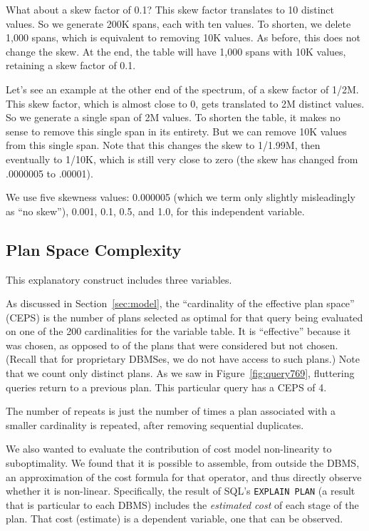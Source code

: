 \documentclass[prodmode,acmtods]{acmsmall}
\begin{document}
What about a skew factor of 0.1? 
This skew factor translates to 10 distinct values. 
So we generate 200K spans, each with ten values. 
To shorten, we delete 1,000 spans, which is equivalent to removing 10K values. 
As before, this does not change the skew.
At the end, the table will have 1,000 spans with 10K values, retaining a
skew factor of 0.1.

Let's see an example at the other end of the spectrum, of a skew factor of
1/2M.  This skew factor, which is almost close to 0, gets translated to 2M
distinct values.  So we generate a single span of 2M values.  To shorten the
table, it makes no sense to remove this single span in its entirety. But we
can remove 10K values from this single span.  Note that this changes the
skew to 1/1.99M, then eventually to 1/10K, which is still very close to zero
(the skew has changed from .0000005 to .00001).

We use five skewness values: 0.000005 (which we term only slightly
misleadingly as ``no skew''), 0.001, 0.1, 0.5, and 1.0,
for this independent variable.

\subsection{Plan Space Complexity}\label{sec:discontinuity}

This explanatory construct includes three variables.

As discussed in Section~\ref{sec:model}, the ``cardinality of the effective plan
space'' (CEPS) is the number of plans selected as optimal for that query
being evaluated on one of the 200 cardinalities for the variable table. It
is ``effective'' because it was chosen, as opposed to of the
plans that were considered but not chosen. (Recall that for proprietary
\hbox{DBMSes}, we do not have access to such plans.) Note that we count only
distinct plans. As we saw in Figure~\ref{fig:query769}, fluttering queries
return to a previous plan. This particular query has a CEPS of 4.

The number of repeats is just the number of times a plan associated with a
smaller cardinality is repeated, after removing sequential
duplicates. 

We also wanted to evaluate the contribution of cost model non-linearity to
suboptimality. We found that it is possible to assemble, from outside the
\hbox{DBMS}, an approximation of the cost formula for that operator, and thus
directly observe whether it is non-linear. Specifically, the result of SQL's
{\tt EXPLAIN PLAN} (a result that is particular to each \hbox{DBMS}) includes the
{\em estimated cost} of each stage of the plan. That cost (estimate) is a
dependent variable, one that can be observed.
\end{document}
